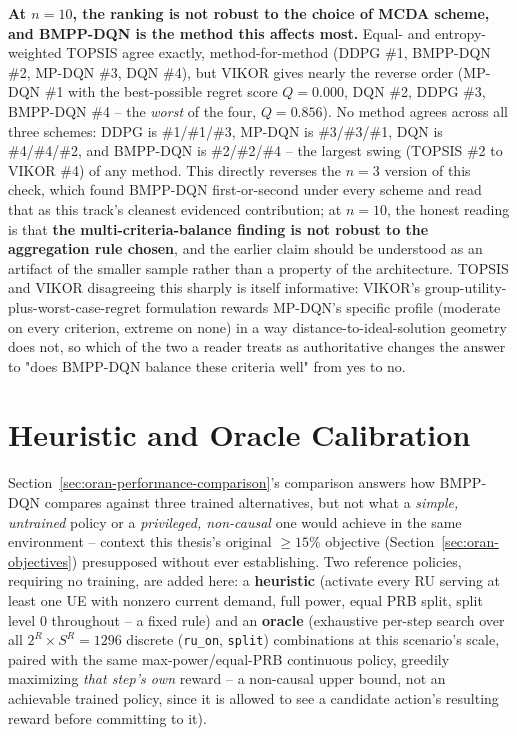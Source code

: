\textbf{At $n=10$, the ranking is not robust to the choice of MCDA
scheme, and BMPP-DQN is the method this affects most.} Equal- and
entropy-weighted TOPSIS agree exactly, method-for-method (DDPG \#1,
BMPP-DQN \#2, MP-DQN \#3, DQN \#4), but VIKOR gives nearly the reverse
order (MP-DQN \#1 with the best-possible regret score $Q=0.000$, DQN \#2,
DDPG \#3, BMPP-DQN \#4 -- the \emph{worst} of the four, $Q=0.856$). No
method agrees across all three schemes: DDPG is \#1/\#1/\#3, MP-DQN is
\#3/\#3/\#1, DQN is \#4/\#4/\#2, and BMPP-DQN is \#2/\#2/\#4 -- the
largest swing (TOPSIS \#2 to VIKOR \#4) of any method. This directly
reverses the $n=3$ version of this check, which found BMPP-DQN first-or-second
under every scheme and read that as this track's cleanest evidenced
contribution; at $n=10$, the honest reading is that \textbf{the
multi-criteria-balance finding is not robust to the aggregation rule
chosen}, and the earlier claim should be understood as an artifact of the
smaller sample rather than a property of the architecture. TOPSIS and
VIKOR disagreeing this sharply is itself informative: VIKOR's
group-utility-plus-worst-case-regret formulation rewards MP-DQN's
specific profile (moderate on every criterion, extreme on none) in a way
distance-to-ideal-solution geometry does not, so which of the two
a reader treats as authoritative changes the answer to "does BMPP-DQN
balance these criteria well" from yes to no.

\section{Heuristic and Oracle Calibration}
\label{sec:oran-calibration}

Section~\ref{sec:oran-performance-comparison}'s comparison answers how
BMPP-DQN compares against three trained alternatives, but not what a
\emph{simple, untrained} policy or a \emph{privileged, non-causal} one
would achieve in the same environment -- context this thesis's original
$\geq15\%$ objective (Section~\ref{sec:oran-objectives}) presupposed
without ever establishing. Two reference policies, requiring no training,
are added here: a \textbf{heuristic} (activate every RU serving at least
one UE with nonzero current demand, full power, equal PRB split, split
level $0$ throughout -- a fixed rule) and an \textbf{oracle} (exhaustive
per-step search over all $2^{R}\!\times\!S^{R}=1296$ discrete
(\texttt{ru\_on}, \texttt{split}) combinations at this scenario's scale,
paired with the same max-power/equal-PRB continuous policy, greedily
maximizing \emph{that step's own} reward -- a non-causal upper bound, not
an achievable trained policy, since it is allowed to see a candidate
action's resulting reward before committing to it).

